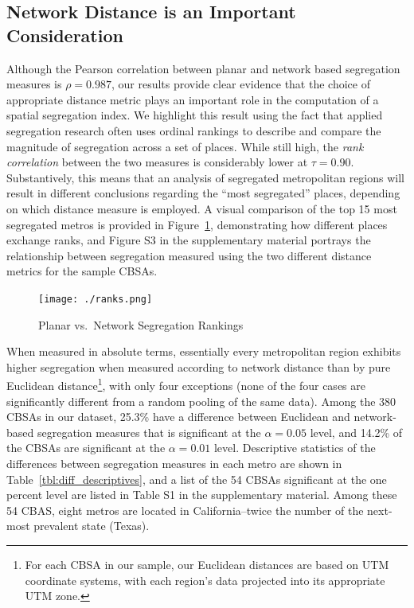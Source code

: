 \documentclass[
  10pt,
]{article}
\begin{document}
\hypertarget{network-distance-is-an-important-consideration}{%
\subsection{Network Distance is an Important
Consideration}\label{network-distance-is-an-important-consideration}}

Although the Pearson correlation between planar and network based
segregation measures is \(\rho=0.987\), our results provide clear
evidence that the choice of appropriate distance metric plays an
important role in the computation of a spatial segregation index. We
highlight this result using the fact that applied segregation research
often uses ordinal rankings to describe and compare the magnitude of
segregation across a set of places. While still high, the \emph{rank
correlation} between the two measures is considerably lower at
\(\tau=0.90\). Substantively, this means that an analysis of segregated
metropolitan regions will result in different conclusions regarding the
``most segregated'' places, depending on which distance measure is
employed. A visual comparison of the top 15 most segregated metros is
provided in Figure~\ref{fig:ranks}, demonstrating how different places
exchange ranks, and Figure S3 in the supplementary material portrays the
relationship between segregation measured using the two different
distance metrics for the sample CBSAs.

\begin{figure}
\hypertarget{fig:ranks}{%
\centering
\texttt{[image: ./ranks.png]}
\caption{Planar vs.~Network Segregation Rankings}\label{fig:ranks}
}
\end{figure}

When measured in absolute terms, essentially every metropolitan region
exhibits higher segregation when measured according to network distance
than by pure Euclidean distance\footnote{For each CBSA in our sample,
  our Euclidean distances are based on UTM coordinate systems, with each
  region's data projected into its appropriate UTM zone.}, with only
four exceptions (none of the four cases are significantly different from
a random pooling of the same data). Among the 380 CBSAs in our dataset,
25.3\% have a difference between Euclidean and network-based segregation
measures that is significant at the \(\alpha=0.05\) level, and 14.2\% of
the CBSAs are significant at the \(\alpha=0.01\) level. Descriptive
statistics of the differences between segregation measures in each metro
are shown in Table~\ref{tbl:diff_descriptives}, and a list of the 54
CBSAs significant at the one percent level are listed in Table S1 in the
supplementary material. Among these 54 CBAS, eight metros are located in
California--twice the number of the next-most prevalent state (Texas).
\end{document}
